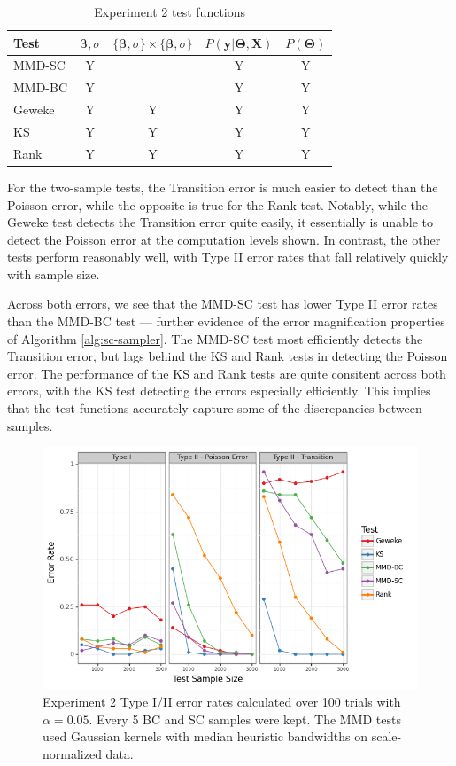 \documentclass[a4paper,11pt]{article}
\begin{document}
\begin{table}[H]
    \centering
    \begin{tabular}{l|c|c|c|c}
         Test  & $\mathbf{\beta}, \sigma$ & $\{\mathbf{\beta}, \sigma\} \times \{\mathbf{\beta}, \sigma\}$ & $P(\mathbf{y}|\mathbf{\Theta}, \mathbf{X})$ & $P(\mathbf{\Theta})$ \\
         \hline
         MMD-SC & Y & & Y & Y \\
         MMD-BC & Y & & Y & Y \\
         Geweke & Y & Y & Y & Y \\
         KS & Y & Y & Y & Y \\
         Rank & Y & Y & Y & Y\\
    \end{tabular}
    \caption{Experiment 2 test functions}
    \label{tab:ex2_testfn}
\end{table}

For the two-sample tests, the Transition error is much easier to detect than the Poisson error, while the opposite is true for the Rank test.  Notably, while the Geweke test detects the Transition error quite easily, it essentially is unable to detect the Poisson error at the computation levels shown. In contrast, the other tests perform reasonably well, with Type II error rates that fall relatively quickly with sample size. 

Across both errors, we see that the MMD-SC test has lower Type II error rates than the MMD-BC test --- further evidence of the error magnification properties of Algorithm \ref{alg:sc-sampler}. The MMD-SC test most efficiently detects the Transition error, but lags behind the KS and Rank tests in detecting the Poisson error. The performance of the KS and Rank tests are quite consitent across both errors, with the KS test detecting the errors especially efficiently. This implies that the test functions accurately capture some of the discrepancies between samples.

\begin{figure}[H]
    \centering
    \includegraphics[width=\textwidth]{figures/bayes_lasso_comparison.png}
    \caption{Experiment 2 Type I/II error rates calculated over 100 trials with $\alpha=0.05$. Every 5 BC and SC samples were kept. The MMD tests used Gaussian kernels with median heuristic bandwidths on scale-normalized data.}
    \label{fig:ex2_comparison}
\end{figure}
\end{document}
